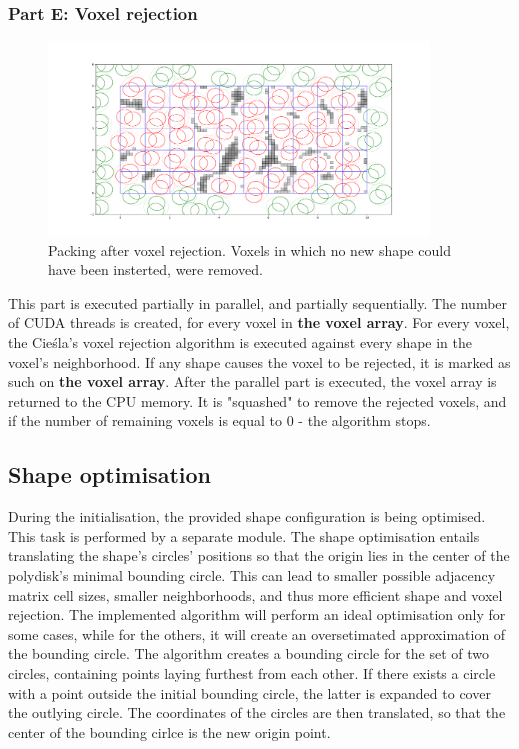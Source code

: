 \documentclass[12pt, oneside]{report}
\begin{document}
\subsubsection{Part E: Voxel rejection}

\begin{figure}[H]
  \centering
	\label{GPURSA_Process_5}
	\includegraphics[width=0.9\textwidth,keepaspectratio]{Images/GPURSA/Figure_6.pdf}
	\caption{Packing after voxel rejection. Voxels in which no new shape could have been insterted, were removed.}
\end{figure}

This part is executed partially in parallel, and partially sequentially. \newline
The number of CUDA threads is created, for every voxel in \textbf{the voxel array}. For every voxel, the Cieśla's voxel rejection algorithm is executed against every shape in the voxel's neighborhood. If any shape causes the voxel to be rejected, it is marked as such on \textbf{the voxel array}. \newline
After the parallel part is executed, the voxel array is returned to the CPU memory. It is "squashed" to remove the rejected voxels, and if the number of remaining voxels is equal to 0 - the algorithm stops.

\subsection{Shape optimisation}

During the initialisation, the provided shape configuration is being optimised. This task is performed by a separate module. The shape optimisation entails translating the shape's circles' positions so that the origin lies in the center of the polydisk's minimal bounding circle. This can lead to smaller possible adjacency matrix cell sizes, smaller neighborhoods, and thus more efficient shape and voxel rejection. \newline
The implemented algorithm will perform an ideal optimisation only for some cases, while for the others, it will create an oversetimated approximation of the bounding circle. The algorithm creates a bounding circle for the set of two circles, containing points laying furthest from each other. If there exists a circle with a point outside the initial bounding circle, the latter is expanded to cover the outlying circle. The coordinates of the circles are then translated, so that the center of the bounding cirlce is the new origin point.
\end{document}
